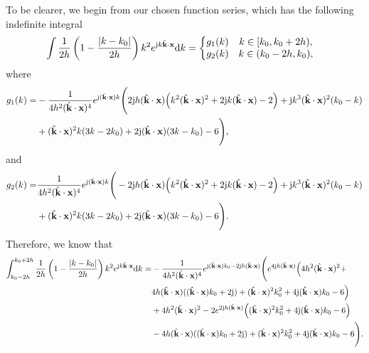 \documentclass[12pt,draftclsnofoot,journal,onecolumn]{IEEEtran}
\begin{document}
	To be clearer, we begin from our chosen function series, which has the following indefinite integral
	 \begin{equation}
	 	\begin{aligned}
	 		&\int\frac{1}{2h}\left( 1-\frac{|k-k_0|}{2h} \right)k^2e^{{\rm j}k\hat{\bf k}\cdot {\bf x}}{\rm d}k
	 		= \left\{\begin{matrix}
	 		g_1(k)	& k \in [k_0,k_0+2h),\\
	 			g_2(k)	& k \in (k_0-2h,k_0),
	 		\end{matrix}\right.
	 	\end{aligned}
	 \end{equation}
	 where
	 \begin{equation}
	 	\begin{aligned}
	 		g_1(k) =& -\frac{1}{4 h^2 (\hat{\bf k}\cdot {\bf x})^4}e^{{\rm j} (\hat{\bf k}\cdot {\bf x}) k} \Bigg(2 {\rm j} h (\hat{\bf k}\cdot {\bf x}) \Big(k^2 (\hat{\bf k}\cdot {\bf x})^2+2 {\rm j} k (\hat{\bf k}\cdot {\bf x})-2\Big)+{\rm j} k^3 (\hat{\bf k}\cdot {\bf x})^2 (k_0-k)\\&+(\hat{\bf k}\cdot {\bf x})^2 k (3 k-2 k_0)+2 {\rm j} (\hat{\bf k}\cdot {\bf x}) (3 k-k_0)-6\Bigg),
		 \end{aligned}
     \end{equation}
     and
    \begin{equation}
    	\begin{aligned}
    		g_2(k) =& \frac{1}{4 h^2 (\hat{\bf k}\cdot {\bf x})^4}e^{{\rm j} (\hat{\bf k}\cdot {\bf x}) k} \Bigg(-2 {\rm j} h (\hat{\bf k}\cdot {\bf x}) \Big(k^2 (\hat{\bf k}\cdot {\bf x})^2+2 {\rm j} k (\hat{\bf k}\cdot {\bf x})-2\Big)+{\rm j} k^3 (\hat{\bf k}\cdot {\bf x})^2 (k_0-k)\\&+(\hat{\bf k}\cdot {\bf x})^2 k (3 k-2 k_0)+2 {\rm j} (\hat{\bf k}\cdot {\bf x}) (3 k-k_0)-6\Bigg).
    	\end{aligned}
    \end{equation} 
    Therefore, we know that 
    \begin{equation}
    	\begin{aligned}
    		\int_{k_0-2h}^{k_0+2h} \frac{1}{2h}\left( 1-\frac{|k-k_0|}{2h} \right)k^2e^{{\rm j}k\hat{\bf k}\cdot {\bf x}}{\rm d}k
    		=& -\frac{1}{4 h^2 (\hat{\bf k}\cdot {\bf x})^4}e^{{\rm j} (\hat{\bf k}\cdot {\bf x}) k_0-2 {\rm j} h (\hat{\bf k}\cdot {\bf x})} 
    		\Bigg(e^{4 {\rm j} h (\hat{\bf k}\cdot {\bf x})} \Big(4 h^2 (\hat{\bf k}\cdot {\bf x})^2+\\&4 h (\hat{\bf k}\cdot {\bf x}) ((\hat{\bf k}\cdot {\bf x}) k_0+2 {\rm j})+(\hat{\bf k}\cdot {\bf x})^2 k_0^2+4 {\rm j} (\hat{\bf k}\cdot {\bf x}) k_0-6\Big)
    		\\&+4 h^2 (\hat{\bf k}\cdot {\bf x})^2-2 e^{2 {\rm j} h (\hat{\bf k}\cdot {\bf x})} \Big((\hat{\bf k}\cdot {\bf x})^2 k_0^2+4 {\rm j} (\hat{\bf k}\cdot {\bf x}) k_0-6\Big)\\&-4 h (\hat{\bf k}\cdot {\bf x}) ((\hat{\bf k}\cdot {\bf x}) k_0+2 {\rm j})+(\hat{\bf k}\cdot {\bf x})^2 k_0^2+4 {\rm j} (\hat{\bf k}\cdot {\bf x}) k_0-6\Bigg).
    	\end{aligned}
    \end{equation}
\end{document}
